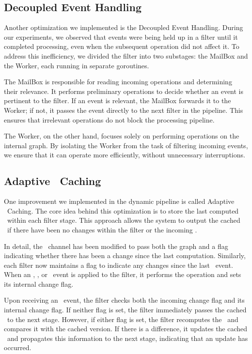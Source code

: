 \subsection*{Decoupled Event Handling \label{sec:dp:decouple}}
Another optimization we implemented is the Decoupled Event Handling. During our experiments, we observed that events were being held up in a filter until it completed processing, even when the subsequent operation did not affect it. To address this inefficiency, we divided the filter into two substages: the MailBox and the Worker, each running in separate goroutines.

The MailBox is responsible for reading incoming operations and determining their relevance. It performs preliminary operations to decide whether an event is pertinent to the filter. If an event is relevant, the MailBox forwards it to the Worker; if not, it passes the event directly to the next filter in the pipeline. This ensures that irrelevant operations do not block the processing pipeline.

The Worker, on the other hand, focuses solely on performing operations on the internal graph. By isolating the Worker from the task of filtering incoming events, we ensure that it can operate more efficiently, without unnecessary interruptions.


\subsection*{Adaptive \mst\ Caching}
One improvement we implemented in the dynamic pipeline is called Adaptive \mst\ Caching. The core idea behind this optimization is to store the last computed \mst\ within each filter stage. This approach allows the system to output the cached \mst\ if there have been no changes within the filter or the incoming \mst.

In detail, the \mst\ channel has been modified to pass both the graph and a flag indicating whether there has been a change since the last computation. Similarly, each filter now maintains a flag to indicate any changes since the last \mst\ event. When an \opinsert, \opremove, or \opupdate\ event is applied to the filter, it performs the operation and sets its internal change flag.

Upon receiving an \opmst\ event, the filter checks both the incoming change flag and its internal change flag. If neither flag is set, the filter immediately passes the cached \mst\ to the next stage. However, if either flag is set, the filter recomputes the \mst\ and compares it with the cached version. If there is a difference, it updates the cached \mst\ and propagates this information to the next stage, indicating that an update has occurred.

